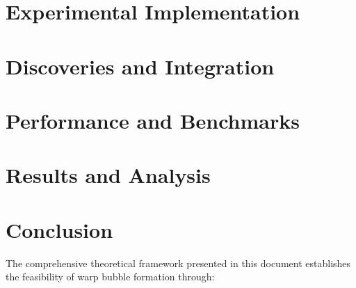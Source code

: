 \documentclass{article}
\begin{document}


\section{Experimental Implementation}





\section{Discoveries and Integration}









\section{Performance and Benchmarks}







\section{Results and Analysis}





\section{Conclusion}

The comprehensive theoretical framework presented in this document establishes the feasibility of warp bubble formation through:
\end{document}
